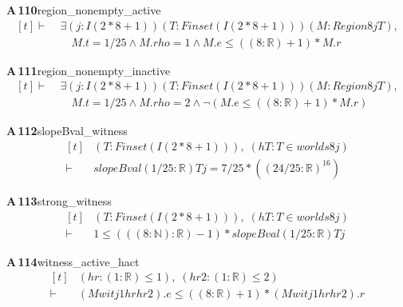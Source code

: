 \documentclass[conference]{IEEEtran}
\theoremstyle{definition}
\newcommand{\lean}[1]{\textsf{\footnotesize #1}}
\begin{document}
\noindent\textbf{A\,110}\quad\lean{region\_nonempty\_active}
{\footnotesize\[ \begin{aligned}[t]
\vdash\;&\exists (\mathit{j} : \mathit{I} (2*8+1)) (\mathit{T} : \mathit{Finset} (\mathit{I} (2*8+1))) (\mathit{M} : \mathit{Region} 8 \mathit{j} \mathit{T}),\\
&\quad \mathit{M}.\mathit{t} = 1/25 \wedge \mathit{M}.\mathit{rho} = 1 \wedge \mathit{M}.\mathit{e} \leq ((8:\mathbb{R} )+1)*\mathit{M}.\mathit{r}
\end{aligned} \]}

\noindent\textbf{A\,111}\quad\lean{region\_nonempty\_inactive}
{\footnotesize\[ \begin{aligned}[t]
\vdash\;&\exists (\mathit{j} : \mathit{I} (2*8+1)) (\mathit{T} : \mathit{Finset} (\mathit{I} (2*8+1))) (\mathit{M} : \mathit{Region} 8 \mathit{j} \mathit{T}),\\
&\quad \mathit{M}.\mathit{t} = 1/25 \wedge \mathit{M}.\mathit{rho} = 2 \wedge \neg (\mathit{M}.\mathit{e} \leq ((8:\mathbb{R} )+1)*\mathit{M}.\mathit{r})
\end{aligned} \]}

\noindent\textbf{A\,112}\quad\lean{slopeBval\_witness}
{\footnotesize\[ \begin{aligned}[t]
&(\mathit{T} : \mathit{Finset} (\mathit{I} (2*8+1))),\; (\mathit{hT} : \mathit{T} \in \mathit{worlds} 8 \mathit{j})\\
\vdash\;&\mathit{slopeBval} (1/25 : \mathbb{R} ) \mathit{T} \mathit{j} = 7/25*((24/25:\mathbb{R} )^{16})
\end{aligned} \]}

\noindent\textbf{A\,113}\quad\lean{strong\_witness}
{\footnotesize\[ \begin{aligned}[t]
&(\mathit{T} : \mathit{Finset} (\mathit{I} (2*8+1))),\; (\mathit{hT} : \mathit{T} \in \mathit{worlds} 8 \mathit{j})\\
\vdash\;&1 \leq (((8:\mathbb{N} ):\mathbb{R} )-1)*\mathit{slopeBval} (1/25 : \mathbb{R} ) \mathit{T} \mathit{j}
\end{aligned} \]}

\noindent\textbf{A\,114}\quad\lean{witness\_active\_hact}
{\footnotesize\[ \begin{aligned}[t]
&(\mathit{hr} : (1:\mathbb{R} ) \leq 1),\; (\mathit{hr2} : (1:\mathbb{R} ) \leq 2)\\
\vdash\;&(\mathit{Mwit} \mathit{j} 1 \mathit{hr} \mathit{hr2}).\mathit{e} \leq ((8:\mathbb{R} )+1)*(\mathit{Mwit} \mathit{j} 1 \mathit{hr} \mathit{hr2}).\mathit{r}
\end{aligned} \]}
\end{document}
